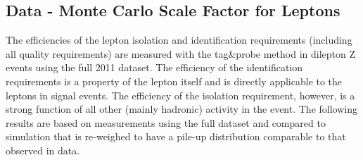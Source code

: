 \subsection{Data - Monte Carlo Scale Factor for Leptons}
\label{sec:tnp}

The efficiencies of the lepton isolation and identification requirements (including all quality requirements) 
are measured with the tag\&probe method in dilepton Z events using the full 2011 dataset.
The efficiency of the identification requirements is a property of the lepton itself and is directly applicable
 to the leptons in signal events.
The efficiency of the isolation requirement, however, is a strong function of all other (mainly hadronic)
activity in the event.
The following results are based on measurements using the full dataset and compared 
to simulation that is re-weighed to have a pile-up distribution comparable to that observed in data.

